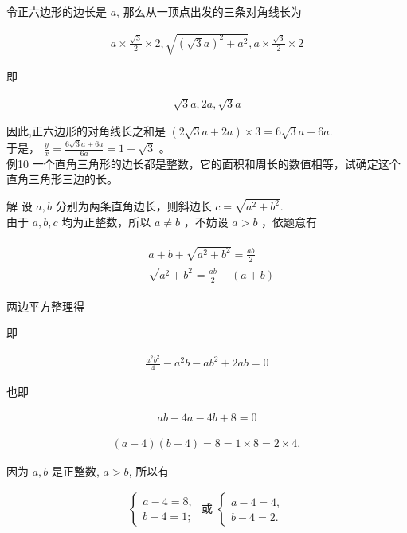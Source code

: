 \documentclass[10pt]{article}
\begin{document}
令正六边形的边长是 $a$, 那么从一顶点出发的三条对角线长为

\begin{align*}
a \times \frac{\sqrt{3}}{2} \times 2, \sqrt{(\sqrt{3} a)^{2}+a^{2}}, a \times \frac{\sqrt{3}}{2} \times 2
\end{align*}

即

\begin{align*}
\sqrt{3} a, 2 a, \sqrt{3} a
\end{align*}

因此,正六边形的对角线长之和是 $(2 \sqrt{3} a+2 a) \times 3=6 \sqrt{3} a+6 a$.\\
于是， $\frac{y}{x}=\frac{6 \sqrt{3} a+6 a}{6 a}=1+\sqrt{3}$ 。\\
例10 一个直角三角形的边长都是整数，它的面积和周长的数值相等，试确定这个直角三角形三边的长。

解 设 $a, b$ 分别为两条直角边长，则斜边长 $c=\sqrt{a^{2}+b^{2}}$.\\
由于 $a, b, c$ 均为正整数，所以 $a \neq b$ ，不妨设 $a>b$ ，依题意有

\begin{align*}
\begin{aligned}
& a+b+\sqrt{a^{2}+b^{2}}=\frac{a b}{2} \\
& \sqrt{a^{2}+b^{2}}=\frac{a b}{2}-(a+b)
\end{aligned}
\end{align*}

两边平方整理得

即

\begin{align*}
\frac{a^{2} b^{2}}{4}-a^{2} b-a b^{2}+2 a b=0
\end{align*}

也即

\begin{align*}
a b-4 a-4 b+8=0
\end{align*}

\begin{align*}
(a-4)(b-4)=8=1 \times 8=2 \times 4,
\end{align*}

因为 $a, b$ 是正整数, $a>b$, 所以有

\begin{align*}
\left\{\begin{array} { l } 
{ a - 4 = 8 , } \\
{ b - 4 = 1 ; }
\end{array} \text { 或 } \left\{\begin{array}{l}
a-4=4, \\
b-4=2 .
\end{array}\right.\right.
\end{align*}
\end{document}
